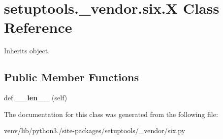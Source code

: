 \hypertarget{classsetuptools_1_1__vendor_1_1six_1_1_x}{}\section{setuptools.\+\_\+vendor.\+six.\+X Class Reference}
\label{classsetuptools_1_1__vendor_1_1six_1_1_x}


Inherits object.

\subsection*{Public Member Functions}
\begin{DoxyCompactItemize}
\item 
\mbox{\label{classsetuptools_1_1__vendor_1_1six_1_1_x_a2594825c23f118a483b92d79cd4ff688}} 
def {\bfseries \+\_\+\+\_\+len\+\_\+\+\_\+} (self)
\end{DoxyCompactItemize}


The documentation for this class was generated from the following file\+:\begin{DoxyCompactItemize}
\item 
venv/lib/python3./site-\/packages/setuptools/\+\_\+vendor/six.\+py\end{DoxyCompactItemize}
